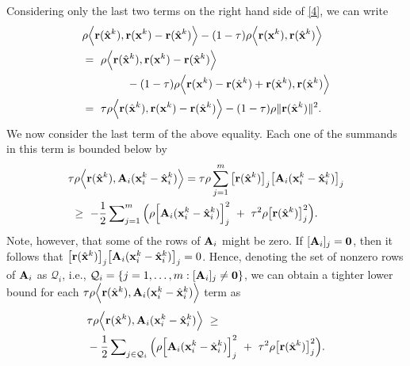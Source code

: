 \documentclass[doublecolumn]{IEEEtran}
\begin{document}
Considering only the last two terms on the right hand side of \eqref{4}, we can write
\begin{align}\label{6}
& {\rho}\Big\langle { {\bf r} }({\hat{\mathbf x}}^k)  , { {\bf r} }({ {\bf x} }^k) - { {\bf r} }({\hat{\mathbf x}}^k) \Big\rangle  - (1-\tau)\rho\Big\langle { {\bf r} }({ {\bf x} }^k),{ {\bf r} }(\hat{ {\bf x} }^k)\Big\rangle  \nonumber\\
&=~{\rho}\Big\langle { {\bf r} }({\hat{\mathbf x}}^k)  , { {\bf r} }({ {\bf x} }^k) - { {\bf r} }({\hat{\mathbf x}}^k) \Big\rangle   \\\nonumber
&\qquad \qquad - (1-\tau)\rho\Big\langle { {\bf r} }({ {\bf x} }^k)- { {\bf r} }({\hat{\mathbf x}}^k) +{ {\bf r} }({\hat{\mathbf x}}^k),{ {\bf r} }(\hat{ {\bf x} }^k)\Big\rangle  \\\nonumber
&=~ \tau\rho\Big\langle { {\bf r} }({\hat{\mathbf x}}^k)  , { {\bf r} }({ {\bf x} }^k) - { {\bf r} }({\hat{\mathbf x}}^k) \Big\rangle  -(1-\tau)\rho\|{ {\bf r} }(\hat{ {\bf x} }^k)\|^2.
\end{align}
We now consider the last term of the above equality. Each one of the summands in this term is bounded below by
\begin{align*}
& \tau\rho\Big\langle { {\bf r} }({\hat{\mathbf x}}^k)  ,  { {\bf A} }_i({ {\bf x} }_i^k-\hat{ {\bf x} }_i^k) \Big\rangle = \tau\rho\sum_{j=1}^m  \big[{ {\bf r} }({\hat{\mathbf x}}^k)\big]_j  \big[ { {\bf A} }_i( { {\bf x} }_i^k-\hat{ {\bf x} }_i^k )\big]_j \\
&~\geq~ -\frac{1}{2} \sum\nolimits_{j=1}^m \Big(\rho\Big[{ {\bf A} }_i({ {\bf x} }_i^k-\hat{ {\bf x} }_i^k)\Big]_j^2 ~+~ \tau^2\rho\big[{ {\bf r} }({\hat{\mathbf x}}^k)\big]_j^2\Big).
\end{align*}
Note, however, that some of the rows of ${ {\bf A} }_i$ might be zero. If $[{ {\bf A} }_i]_j = \mathbf{0}$, then it follows that $ \big[{ {\bf r} }({\hat{\mathbf x}}^k)\big]_j  \big[ { {\bf A} }_i( { {\bf x} }_i^k-\hat{ {\bf x} }_i^k )\big]_j = 0$.   Hence,  denoting the set of nonzero rows of ${ {\bf A} }_i$ as $\mathcal{Q}_i$, i.e., $\mathcal{Q}_i = \{ j = 1,\dots,m : [{ {\bf A} }_i ]_j \neq \mathbf{0} \}$, we can obtain a tighter lower bound for each $\tau\rho\Big\langle { {\bf r} }({\hat{\mathbf x}}^k)  ,  { {\bf A} }_i({ {\bf x} }_i^k-\hat{ {\bf x} }_i^k) \Big\rangle$ term as
\begin{align*}
&\tau\rho\Big\langle { {\bf r} }({\hat{\mathbf x}}^k)  ,  { {\bf A} }_i({ {\bf x} }_i^k-\hat{ {\bf x} }_i^k) \Big\rangle  ~\geq~ \\
&-\frac{1}{2} \sum\nolimits_{j\in\mathcal{Q}_i} \Big(\rho\Big[{ {\bf A} }_i({ {\bf x} }_i^k-\hat{ {\bf x} }_i^k)\Big]_j^2 ~+~ {\tau^2}{\rho}\big[{ {\bf r} }({\hat{\mathbf x}}^k)\big]_j^2\Big).\notag
\end{align*}
\end{document}
